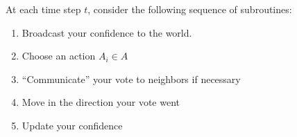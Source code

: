 \documentclass[12pt]{article}
\newcommand{\Comments}{1}
\newcommand{\mynote}[2]{\ifnum\Comments=1\textcolor{#1}{#2}\fi}
\newcommand{\jessie}[1]{\mynote{blue}{[JF: #1]}}
\begin{document}
At each time step $t$, consider the following sequence of subroutines:
\begin{enumerate}
	\item Broadcast your confidence to the world.
	\item Choose an action $A_i \in A$
	\item ``Communicate'' your vote to neighbors if necessary
	\item Move in the direction your vote went
	\item Update your confidence
\end{enumerate}

%
%
%
\end{document}
